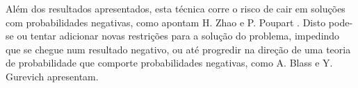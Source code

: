\documentclass{subfiles}
\begin{document}
Além dos resultados apresentados, esta técnica corre o risco de cair em soluções com probabilidades negativas, como apontam H. Zhao e P. Poupart \autocite{Zhao:2014ASL}. Disto pode-se ou tentar adicionar novas restrições para a solução do problema, impedindo que se chegue num resultado negativo, ou até progredir na direção de uma teoria de probabilidade que comporte probabilidades negativas, como A. Blass e Y. Gurevich \autocite{Blass:2021abef4d} apresentam.
\end{document}
